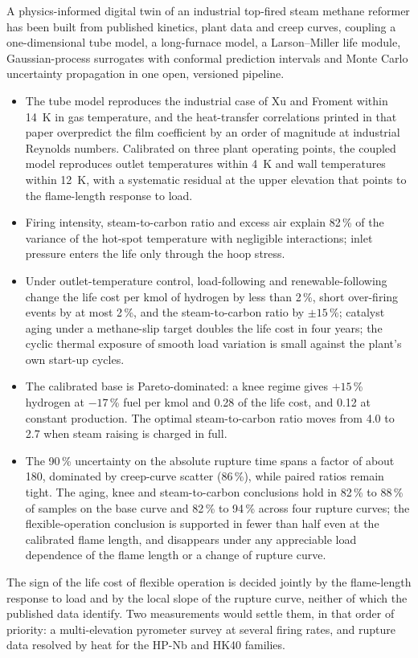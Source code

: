 \documentclass[final,3p,times]{elsarticle}
\begin{document}
A physics-informed digital twin of an industrial top-fired steam methane reformer has been built from published kinetics, plant data and creep curves, coupling a one-dimensional tube model, a long-furnace model, a Larson--Miller life module, Gaussian-process surrogates with conformal prediction intervals and Monte Carlo uncertainty propagation in one open, versioned pipeline.
\begin{itemize}
\item The tube model reproduces the industrial case of Xu and Froment within 14~K in gas temperature, and the heat-transfer correlations printed in that paper overpredict the film coefficient by an order of magnitude at industrial Reynolds numbers. Calibrated on three plant operating points, the coupled model reproduces outlet temperatures within 4~K and wall temperatures within 12~K, with a systematic residual at the upper elevation that points to the flame-length response to load.
\item Firing intensity, steam-to-carbon ratio and excess air explain 82\,\% of the variance of the hot-spot temperature with negligible interactions; inlet pressure enters the life only through the hoop stress.
\item Under outlet-temperature control, load-following and renewable-following change the life cost per kmol of hydrogen by less than 2\,\%, short over-firing events by at most 2\,\%, and the steam-to-carbon ratio by $\pm 15$\,\%; catalyst aging under a methane-slip target doubles the life cost in four years; the cyclic thermal exposure of smooth load variation is small against the plant's own start-up cycles.
\item The calibrated base is Pareto-dominated: a knee regime gives $+15$\,\% hydrogen at $-17$\,\% fuel per kmol and 0.28 of the life cost, and 0.12 at constant production. The optimal steam-to-carbon ratio moves from 4.0 to 2.7 when steam raising is charged in full.
\item The 90\,\% uncertainty on the absolute rupture time spans a factor of about 180, dominated by creep-curve scatter (86\,\%), while paired ratios remain tight. The aging, knee and steam-to-carbon conclusions hold in 82\,\% to 88\,\% of samples on the base curve and 82\,\% to 94\,\% across four rupture curves; the flexible-operation conclusion is supported in fewer than half even at the calibrated flame length, and disappears under any appreciable load dependence of the flame length or a change of rupture curve.
\end{itemize}
The sign of the life cost of flexible operation is decided jointly by the flame-length response to load and by the local slope of the rupture curve, neither of which the published data identify. Two measurements would settle them, in that order of priority: a multi-elevation pyrometer survey at several firing rates, and rupture data resolved by heat for the HP-Nb and HK40 families.
\end{document}
